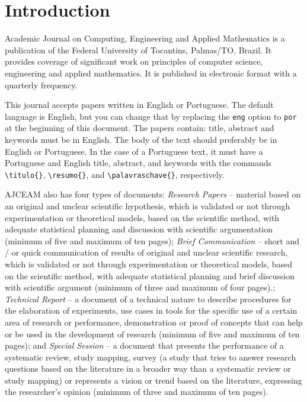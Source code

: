\section{Introduction}
Academic Journal on Computing, Engineering and Applied Mathematics is a publication of the Federal University of Tocantins, Palmas/TO, Brazil. It provides coverage of significant work on principles  of computer science, engineering and applied mathematics. It is published in electronic format with a quarterly frequency.

This journal accepts papers written in English or Portuguese. The default language is English, but you can change that by replacing the \texttt{eng} option to \texttt{por} at the beginning of this document. The papers contain: title, abstract and keywords must be in English. The body of the text should preferably be in English or Portuguese. In the case of a Portuguese text, it must have a Portuguese and English title, abstract, and keywords with the commands \verb|\titulo{}|, \verb|\resumo{}|, and \verb|\palavraschave{}|, respectively.

AJCEAM also has four types of documents: \textit{Research Papers} -- material based on an original and unclear scientific hypothesis, which is validated or not through experimentation or theoretical models, based on the scientific method, with adequate statistical planning and discussion with scientific argumentation (minimum of five and maximum of ten pages); \textit{Brief Communication} -- short and / or quick communication of results of original and unclear scientific research, which is validated or not through experimentation or theoretical models, based on the scientific method, with adequate statistical planning and brief discussion with scientific argument (minimum of three and maximum of four pages).; \textit{Technical Report} -- a document of a technical nature to describe procedures for the elaboration of experiments, use cases in tools for the specific use of a certain area of research or performance, demonstration or proof of concepts that can help or be used in the development of research (minimum of five and maximum of ten pages); and \textit{Special Session} -- a document that presents the performance of a systematic review, study mapping, survey (a study that tries to answer research questions based on the literature in a broader way than a systematic review or study mapping) or represents a vision or trend based on the literature, expressing the researcher's opinion (minimum of three and maximum of ten pages).

